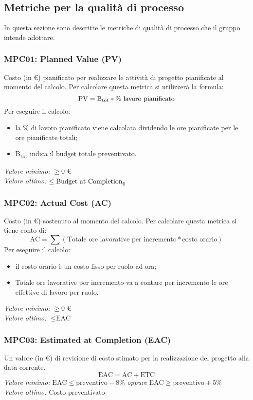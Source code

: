 \subsection{Metriche per la qualità di processo}
In questa sezione sono descritte le metriche di qualità di processo che il gruppo intende adottare.

\subsubsection{MPC01: Planned Value (PV)}
Costo (in \euro) pianificato per realizzare le attività di progetto pianificate al momento del calcolo.
Per calcolare questa metrica si utilizzerà la formula:
\begin{equation*}
\text{PV}=\text{B}\textsubscript{tot} * \%\text{ lavoro pianificato}
\end{equation*}
\noindent Per eseguire il calcolo:
 \begin{itemize}
 \item la \% di lavoro pianificato viene calcolata dividendo le ore pianificate per le ore pianificate totali;
\item B\textsubscript{tot} indica il budget totale preventivato.
 \end{itemize}
\textit{Valore minimo:} $\ge 0$ \euro\\
\textit{Valore ottimo:}	$\le \text{Budget at Completion\textsubscript{g}}$
\subsubsection{MPC02: Actual Cost (AC)}
Costo (in \euro) sostenuto al momento del calcolo.
Per calcolare questa metrica si tiene conto di:
\begin{equation*}
\text{AC}=\sum (\text{Totale ore lavorative per incremento}*\text{costo orario})
\end{equation*}
\noindent Per eseguire il calcolo:
 \begin{itemize}
 \item il costo orario è un costo fisso per ruolo ad ora;
 \item Totale ore lavorative per incremento va a contare per incremento le ore effettive di lavoro per ruolo.
 \end{itemize}
\textit{Valore minimo:} $\ge 0$ \euro\\
\textit{Valore ottimo:} $\le \text{EAC}$
\subsubsection{MPC03: Estimated at Completion (EAC)}
Un valore (in \euro) di revisione di costo stimato per la realizzazione del progetto alla data corrente.
\begin{equation*}
\text{EAC}=\text{AC}+\text{ETC}
\end{equation*}
\textit{Valore minimo:} 
$ \text{EAC} \le \text{preventivo} -8\% $ \textit{oppure} $ \text{EAC} \ge \text{preventivo} +5\% $\\
\textit{Valore ottimo:} Costo preventivato
